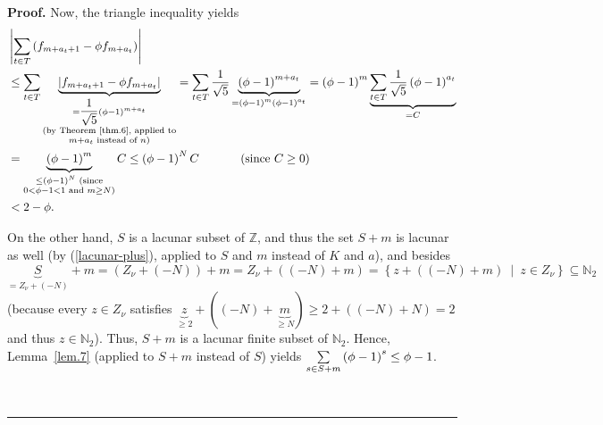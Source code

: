 \documentclass[numbers=enddot,12pt,final,onecolumn,notitlepage]{scrartcl}%
\numberwithin{exer}{section}
\theoremstyle{definition}
\newenvironment{proof}[1][Proof]{\noindent\textbf{#1.} }{\ \rule{0.5em}{0.5em}}
\let\sumnonlimits\sum
\renewcommand{\sum}{\sumnonlimits\limits}
\begin{document}
\begin{proof}
Now, the triangle inequality yields%
\begin{align*}
&  \left\vert \sum\limits_{t\in T}\left(  f_{m+a_{t}+1}-\phi f_{m+a_{t}%
}\right)  \right\vert \\
&  \leq\sum\limits_{t\in T}\underbrace{\left\vert f_{m+a_{t}+1}-\phi
f_{m+a_{t}}\right\vert }_{\substack{=\dfrac{1}{\sqrt{5}}\left(  \phi-1\right)
^{m+a_{t}}\\\text{(by Theorem~\ref{thm.6}, applied to}\\m+a_{t}\text{ instead
of }n\text{)}}}=\sum\limits_{t\in T}\dfrac{1}{\sqrt{5}}\underbrace{\left(
\phi-1\right)  ^{m+a_{t}}}_{=\left(  \phi-1\right)  ^{m}\left(  \phi-1\right)
^{a_{t}}}=\left(  \phi-1\right)  ^{m}\underbrace{\sum\limits_{t\in T}\dfrac
{1}{\sqrt{5}}\left(  \phi-1\right)  ^{a_{t}}}_{=C}\\
&  =\underbrace{\left(  \phi-1\right)  ^{m}}_{\substack{\leq\left(
\phi-1\right)  ^{N}\text{ (since}\\0<\phi-1<1\text{ and }m\geq N\text{)}%
}}C\leq\left(  \phi-1\right)  ^{N}C\ \ \ \ \ \ \ \ \ \ \left(  \text{since
}C\geq0\right) \\
&  <2-\phi.
\end{align*}


On the other hand, $S$ is a lacunar subset of $\mathbb{Z}$, and thus the set
$S+m$ is lacunar as well (by (\ref{lacunar-plus}), applied to $S$ and $m$
instead of $K$ and $a$), and besides $\underbrace{S}_{=Z_{\nu}+\left(
-N\right)  }+m=\left(  Z_{\nu}+\left(  -N\right)  \right)  +m=Z_{\nu}+\left(
\left(  -N\right)  +m\right)  =\left\{  z+\left(  \left(  -N\right)
+m\right)  \ \mid\ z\in Z_{\nu}\right\}  \subseteq\mathbb{N}_{2}$ (because
every $z\in Z_{\nu}$ satisfies $\underbrace{z}_{\geq2}+\left(  \left(
-N\right)  +\underbrace{m}_{\geq N}\right)  \geq2+\left(  \left(  -N\right)
+N\right)  =2$ and thus $z\in\mathbb{N}_{2}$). Thus, $S+m$ is a lacunar finite
subset of $\mathbb{N}_{2}$. Hence, Lemma~\ref{lem.7} (applied to $S+m$ instead
of $S$) yields $\sum\limits_{s\in S+m}\left(  \phi-1\right)  ^{s}\leq\phi-1$.


\end{proof}
\end{document}
